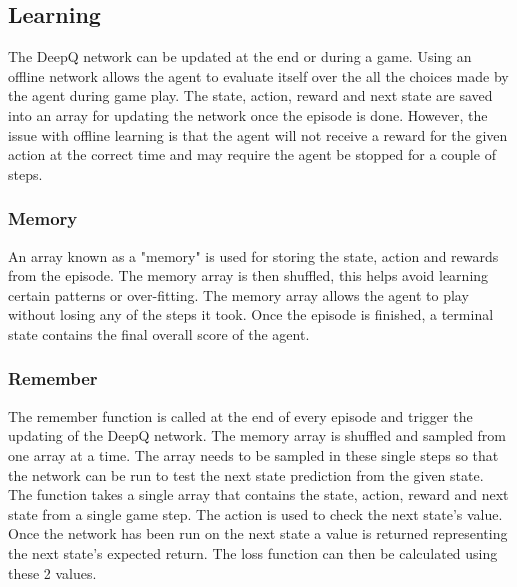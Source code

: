 \subsection{Learning}

The DeepQ network can be updated at the end or during a game. Using an offline network allows the agent to evaluate itself over the all the choices made by the agent during game play. The state, action, reward and next state are saved into an array for updating the network once the episode is done. However, the issue with offline learning is that the agent will not receive a reward for the given action at the correct time and may require the agent be stopped for a couple of steps. 

\subsubsection{Memory}

An array known as a "memory" is used for storing the state, action and rewards from the episode. The memory array is then shuffled, this helps avoid learning certain patterns or over-fitting. The memory array allows the agent to play without losing any of the steps it took. Once the episode is finished, a terminal state contains the final overall score of the agent. 

\subsubsection{Remember}

The remember function is called at the end of every episode and trigger the updating of the DeepQ network. The memory array is shuffled and sampled from one array at a time. The array needs to be sampled in these single steps so that the network can be run to test the next state prediction from the given state. The function takes a single array that contains the state, action, reward and next state from a single game step. The action is used to check the next state's value. Once the network has been run on the next state a value is returned representing the next state's expected return. The loss function can then be calculated using these 2 values.